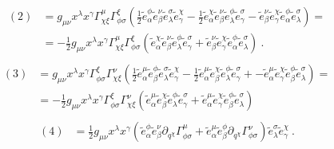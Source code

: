 \documentclass[letterpaper,10pt,english]{jupyterBook}
\begin{document}
\begin{equation*}
\begin{split}\begin{aligned}
  (2)
  & = g_{\mu \nu} x^\lambda x^\gamma \Gamma^{\mu}_{\chi \xi} \Gamma^{\xi}_{\phi \sigma} \left( 
  \frac{1}{2} \widetilde{e}^{\phi}_{\alpha} \widetilde{e}^{\nu}_{\beta} \widetilde{e}^{\sigma}_{\lambda} \widetilde{e}^{\chi}_{\gamma}
    - \frac{1}{2} \widetilde{e}^{\chi}_{\alpha} \widetilde{e}^{\nu}_{\beta}  \widetilde{e}^{\phi}_{\lambda} \widetilde{e}^{\sigma}_{\gamma}  
    - \widetilde{e}^{\nu}_{\beta} \widetilde{e}^{\chi}_{\gamma}  \widetilde{e}^{\phi}_{\alpha } \widetilde{e}^{\sigma}_{\lambda} 
  \right) = \\
  & = -\frac{1}{2} g_{\mu \nu} x^\lambda x^\gamma \Gamma^{\mu}_{\chi \xi} \Gamma^{\xi}_{\phi \sigma} \left( 
    \widetilde{e}^{\chi}_{\alpha} \widetilde{e}^{\nu}_{\beta}  \widetilde{e}^{\phi}_{\lambda} \widetilde{e}^{\sigma}_{\gamma}  
  + \widetilde{e}^{\nu}_{\beta} \widetilde{e}^{\chi}_{\gamma}  \widetilde{e}^{\phi}_{\alpha } \widetilde{e}^{\sigma}_{\lambda} 
  \right) \ .
\end{aligned}\end{split}
\end{equation*}\begin{equation*}
\begin{split}\begin{aligned}
  (3)
  & = g_{\mu \nu} x^\lambda x^\gamma \Gamma^{\xi}_{\phi \sigma} \Gamma^{\nu}_{\chi \xi} \left( \frac{1}{2} \widetilde{e}^{\mu}_{\alpha} \widetilde{e}^{\phi}_{\beta} \widetilde{e}^{\sigma}_{\lambda} \widetilde{e}^{\chi}_{\gamma}
     - \frac{1}{2} \widetilde{e}^{\mu}_{\alpha} \widetilde{e}^{\chi}_{\beta}  \widetilde{e}^{\phi}_{\lambda} \widetilde{e}^{\sigma}_{\gamma} + 
     - \widetilde{e}^{\mu}_{\alpha} \widetilde{e}^{\chi}_{\gamma} \widetilde{e}^{\phi}_{\beta  } \widetilde{e}^{\sigma}_{\lambda}
  \right) = \\
  & = - \frac{1}{2} g_{\mu \nu} x^\lambda x^\gamma \Gamma^{\xi}_{\phi \sigma} \Gamma^{\nu}_{\chi \xi} \left( 
     \widetilde{e}^{\mu}_{\alpha} \widetilde{e}^{\chi}_{\beta}  \widetilde{e}^{\phi}_{\lambda} \widetilde{e}^{\sigma}_{\gamma} + 
     \widetilde{e}^{\mu}_{\alpha} \widetilde{e}^{\chi}_{\gamma} \widetilde{e}^{\phi}_{\beta  } \widetilde{e}^{\sigma}_{\lambda}
  \right) 
\end{aligned}\end{split}
\end{equation*}\begin{equation*}
\begin{split}\begin{aligned}
  (4)
  & = \frac{1}{2} g_{\mu \nu} x^\lambda x^\gamma
     \left(  \widetilde{e}^{\phi}_{\alpha} \widetilde{e}^{\nu}_{\beta} \partial_{q^\chi} \Gamma^{\mu}_{\phi \sigma} 
     +  \widetilde{e}^{\mu}_{\alpha} \widetilde{e}^{\phi}_{\beta}  \partial_{q^\chi} \Gamma^{\nu}_{\phi \sigma}
     \right) \widetilde{e}^{\sigma}_{\lambda} \widetilde{e}^{\chi}_{\gamma} \ .
\end{aligned}\end{split}
\end{equation*}
\end{document}
